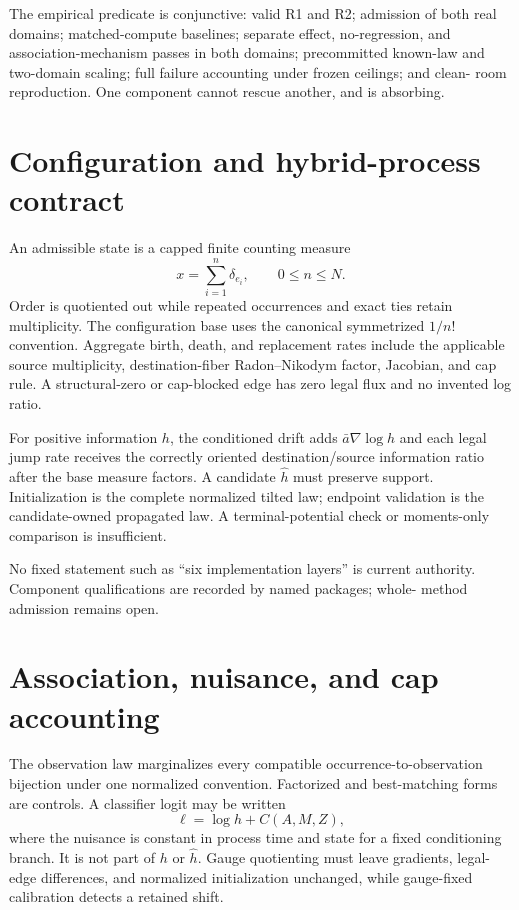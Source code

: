 \documentclass[11pt]{article}
\begin{document}
The empirical predicate is conjunctive: valid R1 and R2; admission of both
real domains; matched-compute baselines; separate effect, no-regression, and
association-mechanism passes in both domains; precommitted known-law and
two-domain scaling; full failure accounting under frozen ceilings; and clean-
room reproduction. One component cannot rescue another, and
 is absorbing.

\section{Configuration and hybrid-process contract}

An admissible state is a capped finite counting measure
\[
x=\sum_{i=1}^{n}\delta_{e_i},\qquad 0\le n\le N.
\]
Order is quotiented out while repeated occurrences and exact ties retain
multiplicity. The configuration base uses the canonical symmetrized
$1/n!$ convention. Aggregate birth, death, and replacement rates include the
applicable source multiplicity, destination-fiber Radon--Nikodym factor,
Jacobian, and cap rule. A structural-zero or cap-blocked edge has zero legal
flux and no invented log ratio.

For positive information $h$, the conditioned drift adds
$\bar a\nabla\log h$ and each legal jump rate receives the correctly oriented
destination/source information ratio after the base measure factors. A
candidate $\widehat h$ must preserve support. Initialization is the complete
normalized tilted law; endpoint validation is the candidate-owned propagated
law. A terminal-potential check or moments-only comparison is insufficient.

No fixed statement such as ``six implementation layers'' is current
authority. Component qualifications are recorded by named packages; whole-
method admission remains open.

\section{Association, nuisance, and cap accounting}

The observation law marginalizes every compatible occurrence-to-observation
bijection under one normalized convention. Factorized and best-matching forms
are controls. A classifier logit may be written
\[
\ell=\log h+C(A,M,Z),
\]
where the nuisance is constant in process time and state for a fixed
conditioning branch. It is not part of $h$ or $\widehat h$. Gauge quotienting
must leave gradients, legal-edge differences, and normalized initialization
unchanged, while gauge-fixed calibration detects a retained shift.
\end{document}
